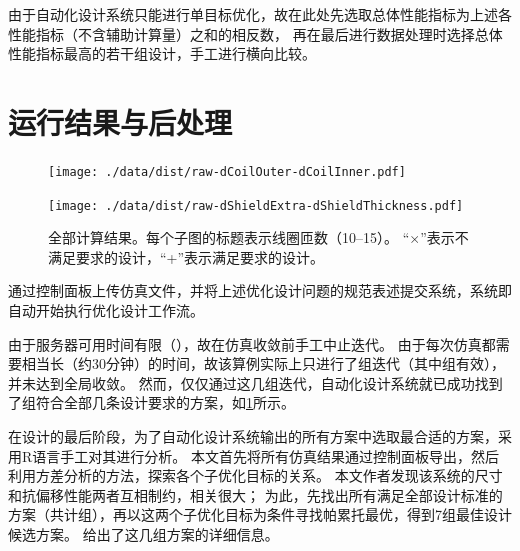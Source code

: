 \documentclass[index]{subfiles}
\begin{document}
由于自动化设计系统只能进行单目标优化，故在此处先选取总体性能指标为上述各性能指标（不含辅助计算量）之和的相反数，
再在最后进行数据处理时选择总体性能指标最高的若干组设计，手工进行横向比较。

\section{运行结果与后处理}
\begin{figure}[p]
  \centering%
    {\texttt{[image: ./data/dist/raw-dCoilOuter-dCoilInner.pdf]}}\par
    {\texttt{[image: ./data/dist/raw-dShieldExtra-dShieldThickness.pdf]}}
  \caption[全部计算结果]{全部计算结果。每个子图的标题表示线圈匝数（\numrange{10}{15}）。
  “$\times$”表示不满足要求的设计，“+”表示满足要求的设计。\label{fig:example-res}}
\end{figure}
通过控制面板上传仿真文件，并将上述优化设计问题的规范表述提交系统，系统即自动开始执行优化设计工作流。

由于服务器可用时间有限（\exmHour{}），故在仿真收敛前手工中止迭代。
由于每次仿真都需要相当长（约30分钟）的时间，故该算例实际上只进行了\exmRaw{}组迭代（其中\exmValid{}组有效），并未达到全局收敛。
然而，仅仅通过这几组迭代，自动化设计系统就已成功找到了\exmFea{}组符合全部几条设计要求的方案，如\cref{fig:example-res}所示。

在设计的最后阶段，为了自动化设计系统输出的所有方案中选取最合适的方案，采用R语言手工对其进行分析。
本文首先将所有仿真结果通过控制面板导出，然后利用方差分析的方法，探索各个子优化目标的关系。
本文作者发现该系统的尺寸和抗偏移性能两者互相制约，相关很大；
为此，先找出所有满足全部设计标准的方案（共计\exmFea{}组），再以这两个子优化目标为条件寻找帕累托最优，得到7组最佳设计候选方案。
给出了这几组方案的详细信息。
\begin{table}[htbp]
  \centering
  \caption[最佳设计方案候选]{最佳设计方案候选。
  其中长度单位\si{\milli\metre}，电感单位\si{\micro\henry}，电阻单位\si{\milli\ohm}。\label{tbl:example-opt}}
  \exmOptTable
\end{table}
\end{document}
